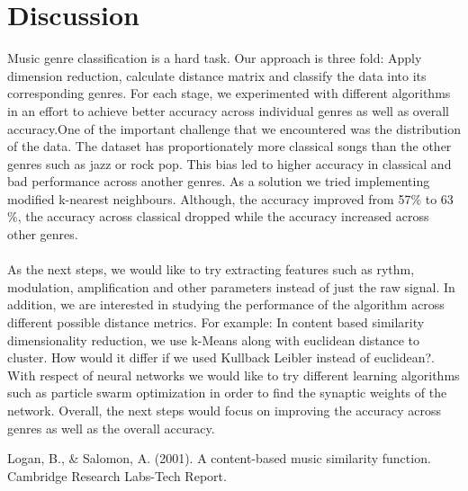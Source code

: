\documentclass[12pt]{article}
\begin{document}
\section{Discussion}
Music genre classification is a hard task. Our approach is three fold: Apply dimension reduction, calculate distance matrix and classify the data into its corresponding genres. For each stage, we experimented with different algorithms in an effort to achieve better accuracy across individual genres as well as overall accuracy.One of the important challenge that we encountered was the distribution of the data. The dataset has proportionately more classical songs than the other genres such as jazz or rock pop. This bias led to higher accuracy in classical and bad performance across another genres. As a solution we tried implementing modified k-nearest neighbours. Although, the accuracy improved from 57$\%$ to 63$\%$, the accuracy across classical dropped while the accuracy increased across other genres.

\paragraph{}
As the next steps, we would like to try extracting features such as rythm, modulation, amplification and other parameters instead of just the raw signal. In addition, we are interested in studying the performance of the algorithm across different possible distance metrics. For example: In content based similarity dimensionality reduction, we use k-Means along with euclidean distance to cluster. How would it differ if we used Kullback Leibler instead of euclidean?. With respect of neural networks we would like to try different learning algorithms such as particle swarm optimization in order to find the synaptic weights of the network. Overall, the next steps would focus on improving the accuracy across genres as well as the overall accuracy.
\begin{thebibliography}{9}
	\label{logan}
	Logan, B., & Salomon, A. (2001). A content-based music similarity function. Cambridge Research Labs-Tech Report.
\end{thebibliography}
\end{document}

